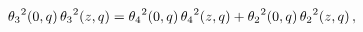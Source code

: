 \[{\mathop{\theta_{3}\/}\nolimits^{2}}\!\left(0,q\right){\mathop{\theta_{3}\/}%
\nolimits^{2}}\!\left(z,q\right)={\mathop{\theta_{4}\/}\nolimits^{2}}\!\left(0%
,q\right){\mathop{\theta_{4}\/}\nolimits^{2}}\!\left(z,q\right)+{\mathop{%
\theta_{2}\/}\nolimits^{2}}\!\left(0,q\right){\mathop{\theta_{2}\/}\nolimits^{%
2}}\!\left(z,q\right),\]